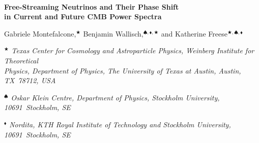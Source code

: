 \documentclass[11pt]{article}
\numberwithin{equation}{section}
\begin{document}
\begin{titlepage}
	\baselineskip=15.5pt \thispagestyle{empty}
	
	\bigskip\
	
	\vspace{1cm}
	\begin{center}
		{\fontsize{20.74}{24}\selectfont \sffamily \bfseries Free-Streaming Neutrinos and Their Phase Shift\\[8pt]in Current and Future CMB Power Spectra}
	\end{center}
	
	\vspace{0.2cm}
	\begin{center}
		{\fontsize{12}{30}\selectfont Gabriele Montefalcone,$^{\bigstar}$ Benjamin Wallisch,$^{\spadesuit,\blacklozenge,\bigstar}$} and Katherine Freese\hskip1pt$^{\bigstar,\spadesuit,\blacklozenge}$
	\end{center}
	
	\begin{center}
		\vskip8pt
		\textsl{$^\bigstar$ Texas Center for Cosmology and Astroparticle Physics, Weinberg Institute for Theoretical\\Physics, Department of Physics, The University of Texas at Austin, Austin, TX~78712, USA}
		
		\vskip8pt
		\textsl{$^\spadesuit$ Oskar Klein Centre, Department of Physics, Stockholm University, 10691~Stockholm, SE}
		
		\vskip8pt
		\textsl{$^\blacklozenge$ Nordita, KTH Royal Institute of Technology and Stockholm University, 10691~Stockholm, SE}
	\end{center}
	

\end{titlepage}
\end{document}
